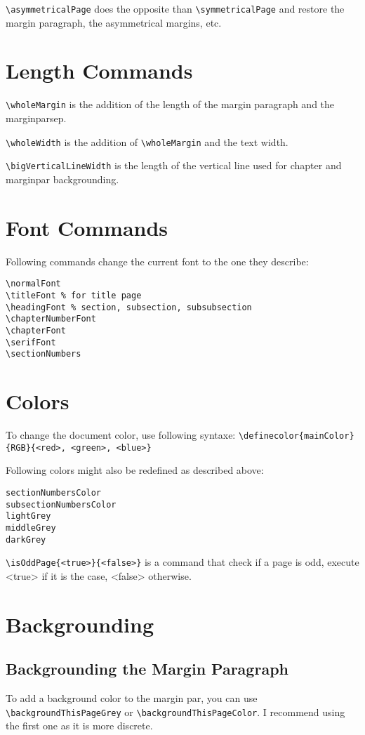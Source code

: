 \documentclass[a4paper, 11pt, oneside, fleqn]{article}
\begin{document}
	\lstinline[breaklines]|\asymmetricalPage| does the opposite than \lstinline[breaklines]|\symmetricalPage| and restore the margin paragraph, the asymmetrical margins, etc.
	
	\section{Length Commands}
	\lstinline[breaklines]|\wholeMargin| is the addition of the length of the margin paragraph and the marginparsep.
	
	\lstinline[breaklines]|\wholeWidth| is the addition of \lstinline[breaklines]|\wholeMargin| and the text width.
	
	\lstinline|\bigVerticalLineWidth| is the length of the vertical line used for chapter and marginpar backgrounding.
	
	\section{Font Commands}
	Following commands change the current font to the one they describe:
	\begin{lstlisting}
\normalFont
\titleFont % for title page
\headingFont % section, subsection, subsubsection
\chapterNumberFont
\chapterFont
\serifFont
\sectionNumbers
	\end{lstlisting}
	
	\section{Colors}
	To change the document color, use following syntaxe: \lstinline[breaklines]|\definecolor{mainColor}{RGB}{<red>, <green>, <blue>}|
	
	Following colors might also be redefined as described above:
	\begin{lstlisting}
sectionNumbersColor
subsectionNumbersColor
lightGrey
middleGrey
darkGrey
	\end{lstlisting}
	
	\lstinline[breaklines]|\isOddPage{<true>}{<false>}| is a command that check if a page is odd, execute <true> if it is the case, <false> otherwise.
	
	\section{Backgrounding}
	\subsection{Backgrounding the Margin Paragraph}
	To add a background color to the margin par, you can use \lstinline[breaklines]|\backgroundThisPageGrey| or \lstinline[breaklines]|\backgroundThisPageColor|. I recommend using the first one as it is more discrete.
	
\end{document}
